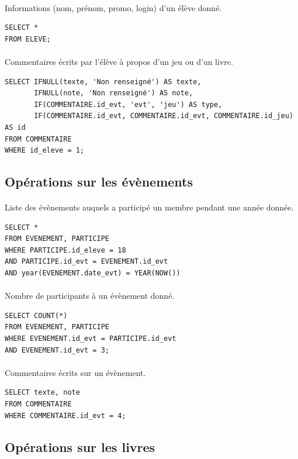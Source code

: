 \documentclass[a4paper, 11pt]{article}
\begin{document}
\paragraph{}
Informations (nom, prénom, promo, login) d'un élève donné.
\begin{verbatim}
SELECT *
FROM ELEVE;
\end{verbatim}
\paragraph{}
Commentaires écrits par l'élève à propos d'un jeu ou d'un livre.
\begin{verbatim}
SELECT IFNULL(texte, 'Non renseigné') AS texte,
       IFNULL(note, 'Non renseigné') AS note,
       IF(COMMENTAIRE.id_evt, 'evt', 'jeu') AS type, 
       IF(COMMENTAIRE.id_evt, COMMENTAIRE.id_evt, COMMENTAIRE.id_jeu) AS id
FROM COMMENTAIRE
WHERE id_eleve = 1;
\end{verbatim}
\subsection{Opérations sur les évènements}
\paragraph{}
Liste des évènements auquels a participé un membre pendant une année donnée.
\begin{verbatim}
SELECT *
FROM EVENEMENT, PARTICIPE
WHERE PARTICIPE.id_eleve = 18
AND PARTICIPE.id_evt = EVENEMENT.id_evt
AND year(EVENEMENT.date_evt) = YEAR(NOW())
\end{verbatim}
\paragraph{}
Nombre de participants à un évènement donné.
\begin{verbatim}
SELECT COUNT(*)
FROM EVENEMENT, PARTICIPE
WHERE EVENEMENT.id_evt = PARTICIPE.id_evt
AND EVENEMENT.id_evt = 3;
\end{verbatim}
\paragraph{}
Commentaires écrits sur un évènement.
\begin{verbatim}
SELECT texte, note 
FROM COMMENTAIRE
WHERE COMMENTAIRE.id_evt = 4;
\end{verbatim}
\subsection{Opérations sur les livres}
\end{document}

